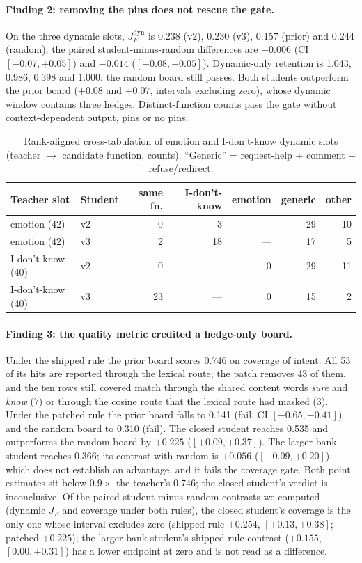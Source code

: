 \paragraph{Finding 2: removing the pins does not rescue the gate.}
On the three dynamic slots, $J_F^{\mathrm{dyn}}$ is 0.238 (v2), 0.230
(v3), 0.157 (prior) and 0.244 (random); the paired student-minus-random
differences are $-0.006$ (CI $[-0.07,+0.05]$) and $-0.014$
($[-0.08,+0.05]$). Dynamic-only retention is 1.043, 0.986, 0.398 and
1.000: the random board still passes.
Both students outperform the prior board ($+0.08$ and $+0.07$, intervals
excluding zero), whose dynamic window contains three hedges.
Distinct-function counts pass the gate without context-dependent output,
pins or no pins.

\begin{table}[t]
\centering
\small
\caption{Rank-aligned cross-tabulation of emotion and I-don't-know dynamic
slots (teacher $\to$ candidate function, counts). ``Generic'' =
request-help + comment + refuse/redirect.}
\label{tab:conf}
\begin{tabular}{@{}llrrrrr@{}}
\toprule
Teacher slot & Student & same fn. & I-don't-know & emotion & generic & other \\
\midrule
emotion (42) & v2 & 0 & 3 & --- & 29 & 10 \\
emotion (42) & v3 & 2 & 18 & --- & 17 & 5 \\
I-don't-know (40) & v2 & 0 & --- & 0 & 29 & 11 \\
I-don't-know (40) & v3 & 23 & --- & 0 & 15 & 2 \\
\bottomrule
\end{tabular}
\end{table}

\paragraph{Finding 3: the quality metric credited a hedge-only board.}
Under the shipped rule the prior board scores 0.746 on coverage of intent.
All 53 of its hits are reported through the lexical route; the patch
removes 43 of them, and the ten rows still covered match through the
shared content words \emph{sure} and \emph{know} (7) or through the cosine
route that the lexical route had masked (3). Under the patched rule the prior board falls to
0.141 (fail, CI $[-0.65,-0.41]$) and the random board to 0.310 (fail). The
closed student reaches 0.535 and outperforms the random board by $+0.225$
($[+0.09,+0.37]$). The larger-bank student reaches 0.366; its contrast
with random is $+0.056$ ($[-0.09,+0.20]$), which does not establish an
advantage, and it fails the coverage gate. Both point estimates sit below $0.9\times$ the teacher's 0.746; the
closed student's verdict is inconclusive. Of the paired
student-minus-random contrasts we computed (dynamic $J_F$ and coverage
under both rules), the closed student's coverage is the only one whose
interval excludes zero (shipped rule $+0.254$, $[+0.13,+0.38]$; patched
$+0.225$); the larger-bank student's shipped-rule contrast ($+0.155$,
$[0.00,+0.31]$) has a lower endpoint at zero and is not read as a
difference.


